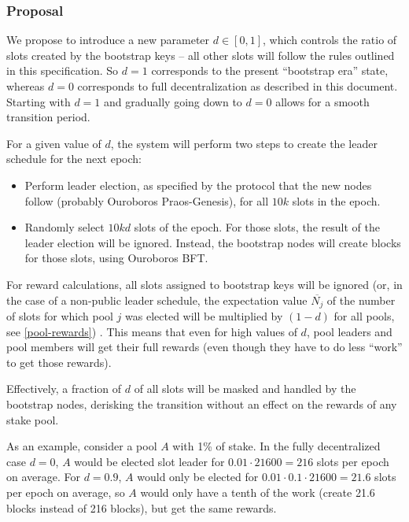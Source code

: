 \documentclass[11pt,a4paper]{article}
\newcommand*\mean[1]{\overline{#1}}
\begin{document}
\subsubsection{Proposal}
\label{proposal}

We propose to introduce a new parameter \(d\in[0,1]\), which controls
the ratio of slots created by the bootstrap keys -- all other slots will
follow the rules outlined in this specification. So \(d=1\) corresponds
to the present ``bootstrap era'' state, whereas \(d=0\) corresponds to
full decentralization as described in this document. Starting with
\(d=1\) and gradually going down to \(d=0\) allows for a smooth
transition period.

For a given value of \(d\), the system will perform two steps to create the
leader schedule for the next epoch:
\begin{itemize}
\item Perform leader election, as specified by the protocol that the new nodes
  follow (probably Ouroboros Praos-Genesis), for all \(10 k\) slots in the
  epoch.
\item Randomly select \(10 k d\) slots of the epoch. For those slots, the result
  of the leader election will be ignored. Instead, the bootstrap nodes will
  create blocks for those slots, using Ouroboros BFT.
\end{itemize}

For reward calculations, all slots assigned to bootstrap keys will be ignored
(or, in the case of a non-public leader schedule, the expectation value
\(\mean{N_j}\) of the number of slots for which pool \(j\) was elected will be
multiplied by \((1-d)\) for all pools, see \cref{pool-rewards}) . This means that
even for high values of \(d\), pool leaders and pool members will get their full
rewards (even though they have to do less ``work'' to get those rewards).

Effectively, a fraction of \(d\) of all slots will be masked and handled by the
bootstrap nodes, derisking the transition without an effect on the rewards of
any stake pool.

As an example, consider a pool \(A\) with 1\% of stake. In the fully
decentralized case \(d=0\), \(A\) would be elected slot leader for
\(0.01\cdot 21600=216\) slots per epoch on average. For \(d=0.9\), \(A\)
would only be elected for \(0.01\cdot 0.1\cdot 21600=21.6\) slots per
epoch on average, so \(A\) would only have a tenth of the work (create
21.6 blocks instead of 216 blocks), but get the same rewards.
\end{document}
